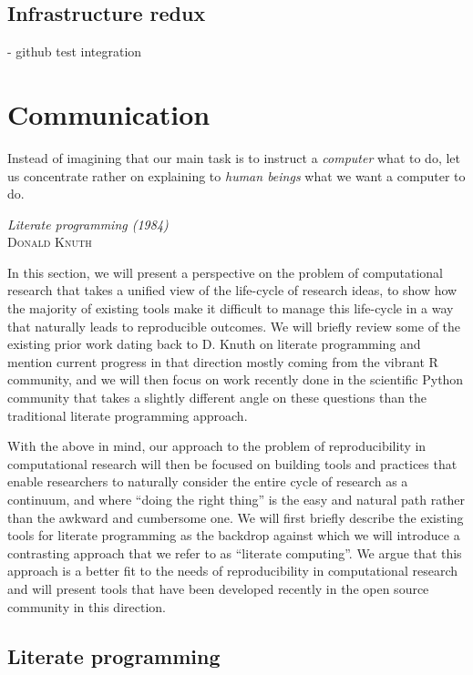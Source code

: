 \documentclass[ChapterTOCs,krantz2]{krantz} %
\theoremstyle{definition}
\begin{document}
\subsection{Infrastructure redux}


- github test integration



\section{\label{sec:communication}Communication}

\setlength{\epigraphrule}{0pt}
\setlength{\epigraphwidth}{.90\textwidth}
\epigraph%
{%
Instead of imagining that our main task is to instruct a \emph{computer}
what to do, let us concentrate rather on explaining to \emph{human beings}
what we want a computer to do.
}%
{\textit{Literate programming (1984)}\\ \textsc{Donald Knuth} }

In this section, we will present a perspective on the problem of
computational research that takes a unified view of the life-cycle of research
ideas, to show how the majority of existing tools make it difficult to manage
this life-cycle in a way that naturally leads to reproducible outcomes.  We
will briefly review some of the existing prior work dating back to D. Knuth on
literate programming \cite{Knuth92} and mention current progress in that
direction mostly coming from the vibrant R community, and we will then focus on
work recently done in the scientific Python community that takes a slightly
different angle on these questions than the traditional literate programming
approach.


With the above in mind, our approach to the problem of reproducibility in
computational research will then be focused on building tools and practices
that enable researchers to naturally consider the entire cycle of research as a
continuum, and where ``doing the right thing'' is the easy and natural path
rather than the awkward and cumbersome one.  We will first briefly describe the
existing tools for literate programming as the backdrop against which we will
introduce a contrasting approach that we refer to as ``literate computing''.
We argue that this approach is a better fit to the needs of reproducibility in
computational research and will present tools that have been developed recently
in the open source community in this direction.



\subsection{Literate programming}
\end{document}
